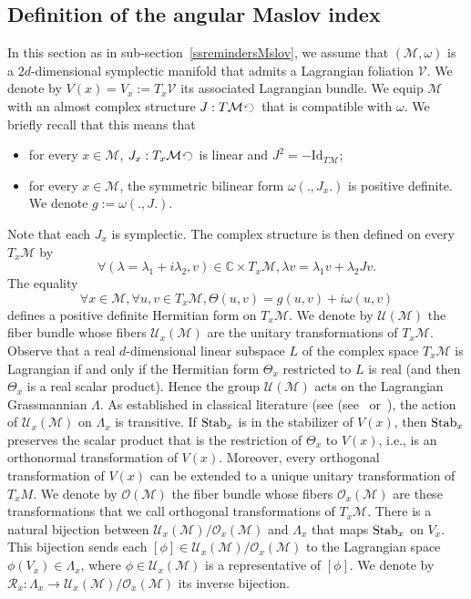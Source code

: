 \documentclass[AHL, Unicode, longabstracts, published]{cedram}
\newcommand*\M{\mathcal{M}}
\newcommand*\cR{\mathcal{R}}
\newcommand*\cU{\mathcal{U}}
\newcommand*\cO{\mathcal{O}}
\newcommand*\cal{\mathcal}
\newcommand{\rId}{\mathrm{Id}}
\newcommand*\C{\mathbb{C}}
\let\oldforall\forall
\renewcommand*{\forall}{\mathrel{\oldforall}}
\begin{document}
\subsection{Definition of the angular Maslov index}\label{def angular MI subsection}
In this section as in sub-section~\ref{ssremindersMslov}, we assume that $(\M,\omega)$ is a $2d$-dimensional symplectic manifold that admits a Lagrangian foliation $\cal V$. We denote by $V(x)=V_x:=T_x\cal V$ its associated Lagrangian bundle. We equip $\M$ with an almost complex structure $J:T\M\,\rotatebox[origin=c]{90}{$\circlearrowleft$}\,$ that is compatible with $\omega$. We briefly recall that this means that
\begin{itemize}
\item for every $x\in\M$, $J_x:T_x\M\,\rotatebox[origin=c]{90}{$\circlearrowleft$}\,$ is linear and $J^2=-\rId_{T\M}$;
\item for every $x\in\M$, the symmetric bilinear form $\omega (., J_x.)$ is positive definite. We denote $g:=\omega(., J.)$.
\end{itemize}
Note that each $J_x$ is symplectic. The complex structure is then defined on every $T_x\M$ by
\[
\forall (\lambda=\lambda_1+i\lambda_2, v)\in \C\times T_x\M, \lambda v=\lambda_1v+\lambda_2Jv.
\]
The equality
\[
\forall x\in\M, \forall u, v\in T_x\M, \Theta(u, v)=g(u, v)+i\omega (u,v)
\]
defines a positive definite Hermitian form on $T_x\M$. We denote by $\cU(\M)$ the fiber bundle whose fibers $\cU_x(\M)$ are the unitary transformations of $T_x\M$. Observe that a real $d$-dimensional linear subspace $L$ of the complex space $T_x\M$ is Lagrangian if and only if the Hermitian form $\Theta_x$ restricted to $L$ is real (and then $\Theta_x$ is a real scalar product). Hence the group $\cU(\M)$ acts on the Lagrangian Grassmannian $\Lambda$. As established in classical literature (see (see~\cite[Lemma~3.10]{BatesWei97} or~\cite{Aud03}), the action of $\cU_x(\M)$ on $\Lambda_x$ is transitive. \newline
If ${\rm Stab}_x$ is in the stabilizer of $V(x)$, then ${\rm Stab}_x$ preserves the scalar product that is the restriction of $\Theta_x$ to $V(x)$, i.e., is an orthonormal transformation of $V(x)$. Moreover, every orthogonal transformation of $V(x)$ can be extended to a unique unitary transformation of $T_xM$. We denote by $\cO(\M)$ the fiber bundle whose fibers $\cO_x(\M)$ are these transformations that we call orthogonal transformations of $T_x\M$. There is a {natural bijection} between $\cU_x(\M)/\cO_x(\M)$ and $\Lambda_x$ that maps ${\rm Stab}_x$ on $V_x$. {This bijection sends each $[\phi]\in \cU_x(\M)/\cO_x(\M)$ to the Lagrangian space $\phi(V_x)\in\Lambda_x$, where $\phi\in\cU_x(\M)$ is a representative of $[\phi]$.} We denote by $\cR_x:\Lambda_x\rightarrow \cU_x(\M)/\cO_x(\M)$ its inverse bijection.
\end{document}

